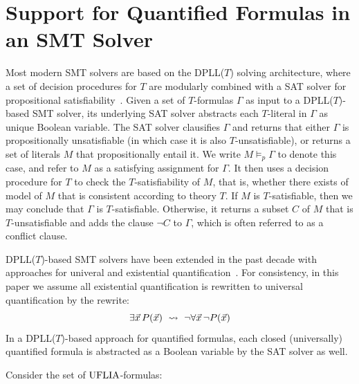 \documentclass[oribibl]{llncs}
\begin{document}
\section{Support for Quantified Formulas in an SMT Solver}
\label{sec:quant}

Most modern SMT solvers are based on the DPLL($T$) solving architecture,
where a set of decision procedures for $T$ are modularly combined with a SAT solver for propositional satisfiability~\cite{nieuwenhuis2006solving}.
Given a set of $T$-formulas $\Gamma$ as input to a DPLL($T$)-based SMT solver, its underlying SAT solver
abstracts each $T$-literal in $\Gamma$ as unique Boolean variable.
The SAT solver clausifies $\Gamma$ and returns that 
either $\Gamma$ is propositionally unsatisfiable (in which case it is also $T$-unsatisfiable),
or returns a set of literals $M$ that propositionally entail it.
We write $M \models_p \Gamma$ to denote this case, and refer to $M$ as a satisfying assignment for $\Gamma$.
It then uses a decision procedure for $T$ to
check the $T$-satisfiability of $M$, that is, whether there exists of model of $M$ that is consistent according to theory $T$.
If $M$ is $T$-satisfiable, then we may conclude that $\Gamma$ is $T$-satisfiable.
Otherwise, it returns a subset $C$ of $M$ that is $T$-unsatisfiable and adds the clause $\neg C$ to $\Gamma$,
which is often referred to as a conflict clause.


DPLL($T$)-based SMT solvers have been extended in the past decade with approaches for univeral and existential quantification~\cite{Detlefs03simplify:a,MouraBjoerner07,GeBarrettTinelli07}.
For consistency, in this paper we assume all existential quantification is rewritten to universal quantification by the rewrite:
\[
\exists \vec x\, P( \vec x ) \ \leadsto \  \neg \forall \vec x\, \neg P( \vec x )
\]
In a DPLL($T$)-based approach for quantified formulas, 
each closed (universally) quantified formula is abstracted as a Boolean variable by the SAT solver as well.

\begin{example}
Consider the set of $\mathrm{UFLIA}$-formulas:

\end{example}
\end{document}
